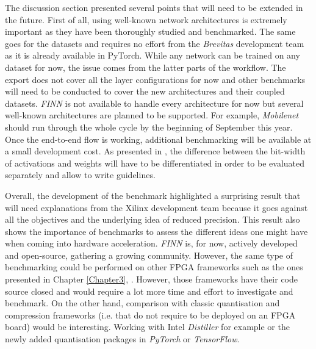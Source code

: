 The discussion section presented several points that will need to be extended in the future. First of all, using well-known network architectures is extremely important as they have been thoroughly studied and benchmarked. The same goes for the datasets and requires no effort from the \emph{Brevitas} development team as it is already available in PyTorch. While any network can be trained on any dataset for now, the issue comes from the latter parts of the workflow. The export does not cover all the layer configurations for now and other benchmarks will need to be conducted to cover the new architectures and their coupled datasets. \emph{FINN} is not available to handle every architecture for now but several well-known architectures are planned to be supported. For example, \emph{Mobilenet} should run through the whole cycle by the beginning of September this year. Once the end-to-end flow is working, additional benchmarking will be available at a small development cost. As presented in \cite{Bacchus2020}, the difference between the bit-width of activations and weights will have to be differentiated in order to be evaluated separately and allow to write guidelines.

Overall, the development of the benchmark highlighted a surprising result that will need explanations from the Xilinx development team because it goes against all the objectives and the underlying idea of reduced precision. This result also shows the importance of benchmarks to assess the different ideas one might have when coming into hardware acceleration. \emph{FINN} is, for now, actively developed and open-source, gathering a growing community. However, the same type of benchmarking could be performed on other FPGA frameworks such as the ones presented in Chapter \ref{Chapter3}, \cite{Andri2016, Zhao2016, Venieris2017, Ding2019, Jahanshahi2019}. However, those frameworks have their code source closed and would require a lot more time and effort to investigate and benchmark. On the other hand, comparison with classic quantisation and compression frameworks (i.e. that do not require to be deployed on an FPGA board) would be interesting. Working with Intel \emph{Distiller} \cite{Nzmora2019} for example or the newly added quantisation packages in \emph{PyTorch} or \emph{TensorFlow}.
